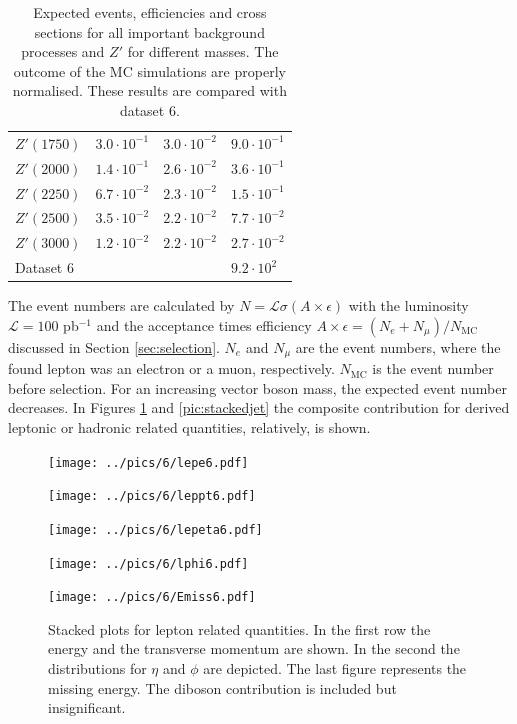 \begin{table}[H]
\begin{tabular}{l|l|l|l}
$Z'(1750)$&$3.0\cdot 10^{-1}$&$3.0\cdot 10^{-2}$ &$9.0\cdot 10^{-1}$\\
$Z'(2000)$&$1.4\cdot 10^{-1}$&$2.6\cdot 10^{-2}$ &$3.6\cdot 10^{-1}$\\
$Z'(2250)$&$6.7\cdot 10^{-2}$&$2.3\cdot 10^{-2}$ &$1.5\cdot 10^{-1}$\\
$Z'(2500)$&$3.5\cdot 10^{-2}$&$2.2\cdot 10^{-2}$ &$7.7\cdot 10^{-2}$\\
$Z'(3000)$&$1.2\cdot 10^{-2}$&$2.2\cdot 10^{-2}$ &$2.7\cdot 10^{-2}$\\
\hline
Dataset 6 & & &$9.2\cdot 10^{2}$
 \end{tabular}
 \caption{\small{Expected events, efficiencies and cross sections for all important background processes and $Z'$ for different masses. The outcome of the MC
 simulations are properly normalised. These results are compared with dataset 6.}}
 \label{tab:expEvents}
\end{table}
The event numbers are calculated by $N=\mathcal{L}\sigma (A\times \epsilon)$ with the luminosity $\mathcal{L}=100$ pb$^{-1}$ and the acceptance times
efficiency $A\times\epsilon = (N_e+N_\mu)/N_\text{MC}$ discussed in Section \ref{sec:selection}. $N_e$ and $N_\mu$ are the event numbers, where the found
lepton was an electron or a muon, respectively. $N_\text{MC}$ is the event number before selection.
For an increasing vector boson mass, the expected event number decreases. 
In Figures \ref{pic:stackedlep} and \ref{pic:stackedjet} the composite contribution for derived leptonic or hadronic
related quantities, relatively, is shown. 
\begin{figure}[H]
\begin{minipage}{\minwidththree\textwidth}
 \texttt{[image: ../pics/6/lepe6.pdf]}
\end{minipage}
\begin{minipage}{\minwidththree\textwidth}
 \texttt{[image: ../pics/6/leppt6.pdf]}
\end{minipage}

\begin{minipage}{\minwidththree\textwidth}
 \texttt{[image: ../pics/6/lepeta6.pdf]}
\end{minipage}
\begin{minipage}{\minwidththree\textwidth}
 \texttt{[image: ../pics/6/lphi6.pdf]}
\end{minipage}

\begin{minipage}{\minwidththree\textwidth}
 \texttt{[image: ../pics/6/Emiss6.pdf]}
\end{minipage}
\caption{\small{Stacked plots for lepton related quantities. In the first row the energy and the transverse momentum are shown. In the second the distributions
for $\eta$ and $\phi$ are depicted. The last figure represents the missing energy. The diboson contribution is included but insignificant.}}
\label{pic:stackedlep}
 
\end{figure}

